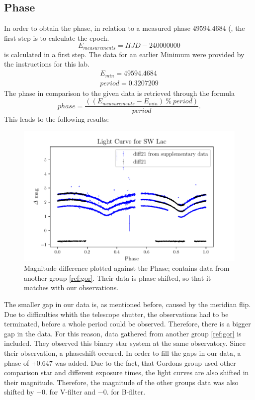 \subsection{Phase}
  \label{sec:again}
  In order to obtain the phase, in relation to a measured phase $49594.4684$ (, the first step is to calculate the epoch.
  \begin{equation*}
    E_{measurements} = HJD - 240000000
  \end{equation*}
  is calculated in a first step. The data for an earlier Minimum were provided by the 
  instructions for this lab. 
  \begin{align*}
    E_{min} = 49594.4684\\
    period = 0.3207209
  \end{align*}
  The phase in comparison to the given data is retrieved through the formula
  \begin{equation}
    phase = \dfrac{((E_{measurements}-E_{min})\ \% \ period)}{period}.
  \end{equation}
  This leads to the following results:
  \begin{figure}[H]
    \centering
    \includegraphics{gdPhase.pdf}
    \caption{Magnitude difference plotted against the Phase; contains data from another group
    \ref{ref:gor}. Their data is phase-shifted, so that it matches with our observations.}
    \label{fig:phase}
  \end{figure}
  The smaller gap in our data is, as mentioned before, caused by the meridian flip. 
  Due to difficulties whith the telescope shutter, the observations had to be terminated, 
  before a whole period could be observed. Therefore, there is a bigger gap in the 
  data. For this reason, data gathered from another group \ref{ref:gor} is included. 
  They observed this binary star system at the same observatory. Since their
  observation, a phaseshift occured. In order to fill the gaps in our data,
  a phase of $+0.647$ was added. Due to the fact, that Gordons group used other 
  comparison star and different exposure times, the light curves are also shifted in their
  magnitude. Therefore, the magnitude of the other groups data was also shifted
  by $-0.  $ for V-filter and $-0. $ for B-filter.\\
 

